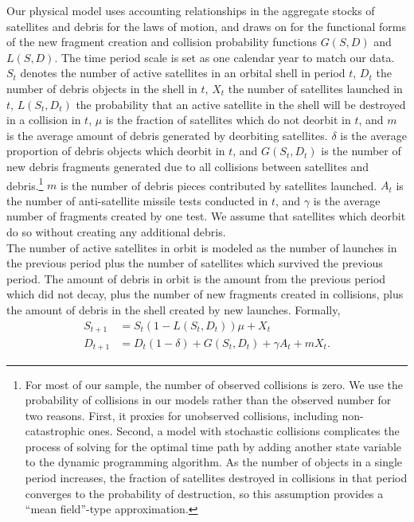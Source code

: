 \documentclass[12pt]{article}
\begin{document}
Our physical model uses accounting relationships in the aggregate stocks of satellites and debris for the laws of motion, and draws on \citep{letiziaetal2017} for the functional forms of the new fragment creation and collision probability functions $G(S,D)$ and $L(S,D)$. The time period scale is set as one calendar year to match our data. $S_t$ denotes the number of active satellites in an orbital shell in period $t$, $D_t$ the number of debris objects in the shell in $t$, $X_t$ the number of satellites launched in $t$, $L(S_t,D_t)$ the probability that an active satellite in the shell will be destroyed in a collision in $t$, $\mu$ is the fraction of satellites which do not deorbit in $t$, and $m$ is the average amount of debris generated by deorbiting satellites. $\delta$ is the average proportion of debris objects which deorbit in $t$, and $G(S_t,D_t)$ is the number of new debris fragments generated due to all collisions between satellites and debris.\footnote{For most of our sample, the number of observed collisions is zero. We use the probability of collisions in our models rather than the observed number for two reasons. First, it proxies for unobserved collisions, including non-catastrophic ones. Second, a model with stochastic collisions complicates the process of solving for the optimal time path by adding another state variable to the dynamic programming algorithm. As the number of objects in a single period increases, the fraction of satellites destroyed in collisions in that period converges to the probability of destruction, so this assumption provides a ``mean field''-type approximation.} $m$ is the number of debris pieces contributed by satellites launched. $A_t$ is the number of anti-satellite missile tests conducted in $t$, and $\gamma$ is the average number of fragments created by one test. We assume that satellites which deorbit do so without creating any additional debris. \\

The number of active satellites in orbit is modeled as the number of launches in the previous period plus the number of satellites which survived the previous period. The amount of debris in orbit is the amount from the previous period which did not decay, plus the number of new fragments created in collisions, plus the amount of debris in the shell created by new launches. Formally,
\begin{align}
\label{satelliteLoM}
S_{t+1} &= S_t(1 - L(S_t,D_t))\mu + X_t \\
\label{debrisLoM}
D_{t+1} &= D_t(1-\delta) + G(S_t,D_t) + \gamma A_t + mX_t.
\end{align}
\end{document}

